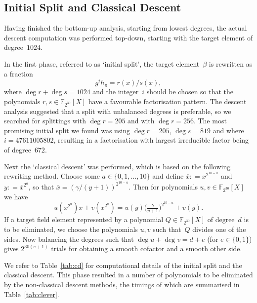 \documentclass[11pt]{llncs}
\newcommand{\F}{\mathbb F}
\newcommand{\defeq}{\mathrel{\mathop:}=}
\begin{document}
\subsection{Initial Split and Classical Descent}

Having finished the bottom-up analysis, starting from lowest degrees,
the actual descent computation was performed top-down, starting with
the target element of degree~$\num{1024}$.

In the first phase, referred to as `initial split', the target
element~$\beta$ is rewritten as a fraction
\[ g^i h_{\pi} = r(x) / s(x) , \] where
$\deg r + \deg s = \num{1024}$ and the integer~$i$ should be chosen so that
the polynomials $r, s \in \F_{2^{30}}[X]$ have a favourable factorisation
pattern.  The descent analysis suggested that a split with unbalanced
degrees is preferable, so we searched for splittings with
$\deg r = 205$ and with $\deg r = 256$.  The most promising initial
split we found was using $\deg r = 205$, $\deg s = 819$ and where
$i = \num{47611005802}$, resulting in a factorisation with largest
irreducible factor being of degree~$672$.

Next the `classical descent' was performed, which is based on the
following rewriting method.  Choose some $a \in \{ 0, 1, \dots, 10 \}$
and define $\overline x \defeq x^{2^{10 - a}}$ and $y \defeq \overline
x^{2^a}$, so that $\overline x = (\gamma / (y \!+\! 1))^{2^{10 - a}}$.
Then for polynomials $u, v \in \F_{2^{30}}[X]$ we have
\[ u(\overline x^{2^a}) \overline x + v(\overline x^{2^a})
  = u(y) \big( \tfrac {\gamma} {y + 1} \big)^{2^{10 - a}} + v(y) . \]
If a target field element represented by a polynomial
$Q \in \F_{2^{30}}[X]$ of degree~$d$ is to be eliminated, we choose
the polynomials $u, v$ such that~$Q$ divides one of the sides.  Now
balancing the degrees such that $\deg u + \deg v = d + e$ (for
$e \in \{ 0, 1 \}$) gives $2^{30 (e + 1)}$ trials for obtaining a
smooth cofactor and a smooth other side.

We refer to Table~\ref{tab:cd} for computational details of the
initial split and the classical descent.  This phase resulted in a
number of polynomials to be eliminated by the non-classical descent
methods, the timings of which are summarised in
Table~\ref{tab:clever}.
\end{document}
